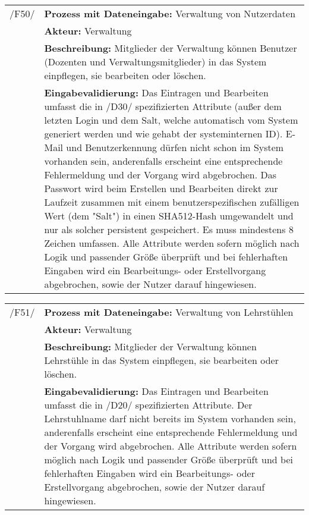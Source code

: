\begin{tabular}{p{1.5cm}p{14.5cm}}
	
	 /F50/	& \textbf{Prozess mit Dateneingabe:} Verwaltung von Nutzerdaten \\
				& \textbf{Akteur:} Verwaltung \\
				& \textbf{Beschreibung:} Mitglieder der Verwaltung können Benutzer (Dozenten und Verwaltungsmitglieder) in das System einpflegen, sie bearbeiten oder löschen. \\
				& \textbf{Eingabevalidierung:} Das Eintragen und Bearbeiten umfasst die in /D30/ spezifizierten Attribute (außer dem letzten Login und dem Salt, welche automatisch vom System generiert werden und wie gehabt der systeminternen ID). E-Mail und Benutzerkennung dürfen nicht schon im System vorhanden sein, anderenfalls erscheint eine entsprechende Fehlermeldung und der Vorgang wird abgebrochen. Das Passwort wird beim Erstellen und Bearbeiten direkt zur Laufzeit zusammen mit einem benutzerspezifischen zufälligen Wert (dem "Salt") in einen SHA512-Hash umgewandelt und nur als solcher persistent gespeichert. Es muss mindestens 8 Zeichen umfassen. Alle Attribute werden sofern möglich nach Logik und passender Größe überprüft und bei fehlerhaften Eingaben wird ein Bearbeitungs- oder Erstellvorgang abgebrochen, sowie der Nutzer darauf hingewiesen.\\[0.25cm]

\end{tabular}


\begin{tabular}{p{1.5cm}p{14.5cm}}
					
	 /F51/	& \textbf{Prozess mit Dateneingabe:} Verwaltung von Lehrstühlen \\
				& \textbf{Akteur:} Verwaltung \\
				& \textbf{Beschreibung:} Mitglieder der Verwaltung können Lehrstühle in das System einpflegen, sie bearbeiten oder löschen. \\
				& \textbf{Eingabevalidierung:} Das Eintragen und Bearbeiten umfasst die in /D20/ spezifizierten Attribute. Der Lehrstuhlname darf nicht bereits im System vorhanden sein, anderenfalls erscheint eine entsprechende Fehlermeldung und der Vorgang wird abgebrochen. Alle Attribute werden sofern möglich nach Logik und passender Größe überprüft und bei fehlerhaften Eingaben wird ein Bearbeitungs- oder Erstellvorgang abgebrochen, sowie der Nutzer darauf hingewiesen.\\[0.25cm]

\end{tabular}


